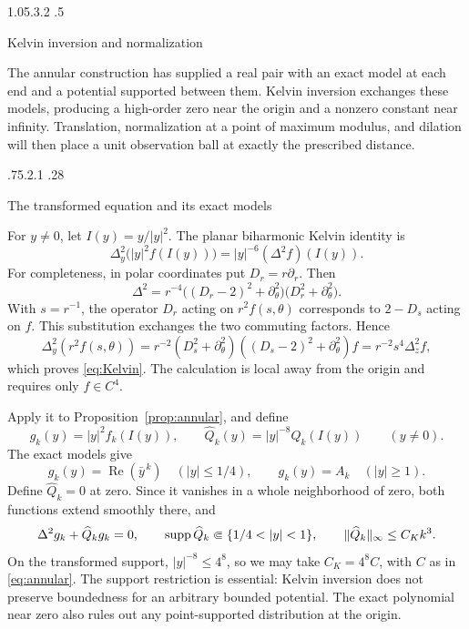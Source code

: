 \documentclass[11pt,a4paper,leqno]{amsart}
\makeatletter
\numberwithin{equation}{section}
\theoremstyle{landisplain}
\theoremstyle{landisdefinition}
\theoremstyle{landisremark}
\newcommand{\pa}{\partial}
\newcommand{\Rea}{\operatorname{Re}}
\newcommand{\supp}{\operatorname{supp}}
\DeclarePairedDelimiter{\norm}{\lVert}{\rVert}
\renewcommand\section{\Needspace{7\baselineskip}\@startsection{section}{1}{\z@}%
  {1.05\baselineskip \@plus .3\baselineskip \@minus .2\baselineskip}%
  {.5\baselineskip}%
  {\normalfont\large\bfseries\raggedright}}
\renewcommand\subsection{\@startsection{subsection}{2}{\z@}%
  {.75\baselineskip \@plus .2\baselineskip \@minus .1\baselineskip}%
  {.28\baselineskip}%
  {\normalfont\bfseries\raggedright}}
\makeatother
\begin{document}
\section{Kelvin inversion and normalization}
\label{sec:kelvin}

The annular construction has supplied a real pair with an exact
model at each end and a potential supported between them. Kelvin
inversion exchanges these models, producing a high-order zero
near the origin and a nonzero constant near infinity. Translation,
normalization at a point of maximum modulus, and dilation will then
place a unit observation ball at exactly the prescribed distance.

\subsection{The transformed equation and its exact models}

For $y\ne0$, let $I(y)=y/|y|^2$. The planar biharmonic Kelvin
identity is
\begin{equation}\label{eq:Kelvin}
 \Delta_y^2\bigl(|y|^2f(I(y))\bigr)
 =|y|^{-6}(\Delta^2f)(I(y)).
\end{equation}
For completeness, in polar coordinates put $D_r=r\pa_r$. Then
\[
 \Delta^2=r^{-4}
     \bigl((D_r-2)^2+\pa_\theta^2\bigr)
     \bigl(D_r^2+\pa_\theta^2\bigr).
\]
With $s=r^{-1}$, the operator $D_r$ acting on
$r^2f(s,\theta)$ corresponds to $2-D_s$ acting on $f$.
This substitution exchanges the two commuting factors. Hence
\[
 \Delta_y^2(r^2f(s,\theta))
 =r^{-2}(D_s^2+\pa_\theta^2)
              ((D_s-2)^2+\pa_\theta^2)f
 =r^{-2}s^4\Delta_z^2f,
\]
which proves \eqref{eq:Kelvin}. The calculation is local away
from the origin and requires only $f\in C^4$.

Apply it to Proposition~\ref{prop:annular}, and define
\begin{equation}\label{eq:kelvin-pair}
 g_k(y)=|y|^2f_k(I(y)),\qquad
 \widehat Q_k(y)=|y|^{-8}Q_k(I(y))\qquad(y\ne0).
\end{equation}
The exact models give
\begin{equation}\label{eq:gmodels}
 g_k(y)=\Rea(\bar y^{\,k})\quad(|y|\le1/4),\qquad
 g_k(y)=A_k\quad(|y|\ge1).
\end{equation}
Define $\widehat Q_k=0$ at zero. Since it vanishes in a whole
neighborhood of zero, both functions extend smoothly there, and
\begin{equation}\label{eq:kelvin-budget}
 \Delta^2g_k+\widehat Q_kg_k=0,\qquad
 \supp\widehat Q_k\Subset\{1/4<|y|<1\},\qquad
 \norm{\widehat Q_k}_\infty\le C_Kk^3.
\end{equation}
On the transformed support, $|y|^{-8}\le4^8$, so we may
take $C_K=4^8C$, with $C$ as in \eqref{eq:annular}.
The support restriction is essential: Kelvin inversion does not
preserve boundedness for an arbitrary bounded potential. The exact
polynomial near zero also rules out any point-supported
distribution at the origin.
\end{document}

